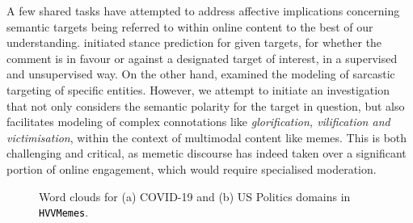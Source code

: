 \documentclass[11pt]{article}
\newcommand{\dataset}{\textcolor{black}{\texttt{HVVMemes}}}
\begin{document}
\begin{table}[t!]
\centering
{}
\caption{Few examples of \textit{resolution remarks}, provided to the annotators towards entity identification.}
\label{tab:res_table}
\end{table} 
A few shared tasks have attempted to address affective implications concerning semantic targets being referred to within online content to the best of our understanding. \citet{Ruifeng2016} initiated stance prediction for given targets, for whether the comment is in favour or against a designated target of interest, in a supervised and unsupervised way. On the other hand, \citet{molla-joshi-2019-overview} examined the modeling of sarcastic targeting of specific entities. However, we attempt to initiate an investigation that not only considers the semantic polarity for the target in question, but also facilitates modeling of complex connotations like \textit{glorification, vilification and victimisation}, within the context of multimodal content like memes. This is both challenging and critical, as memetic discourse has indeed taken over a significant portion of online engagement, which would require specialised moderation.  
% 

\begin{figure}[t!]
\centering
{}\hspace{0.1mm}
\hspace{0.1mm}
\caption{Word clouds for (a) COVID-19 and (b) US Politics domains in \dataset.}
\label{fig:gen_stat}
\end{figure}
\end{document}
